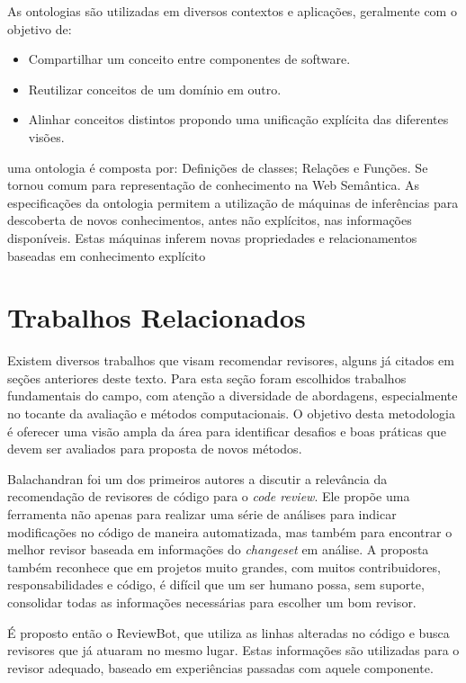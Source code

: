 \documentclass[a4paper,12pt]{monografia}
\theoremstyle{plain}
\theoremstyle{definition}
\theoremstyle{remark}
\begin{document}
As ontologias são utilizadas em diversos contextos e aplicações, geralmente com o objetivo de:

\begin{itemize}
  \item Compartilhar um conceito entre componentes de software.
  \item Reutilizar conceitos de um domínio em outro.
  \item Alinhar conceitos distintos propondo uma unificação explícita das diferentes visões.
\end{itemize}

uma ontologia é composta por: Definições de classes; Relações e Funções. Se tornou comum para representação de conhecimento na Web Semântica. As especificações da ontologia permitem a utilização de máquinas de inferências para descoberta de novos conhecimentos, antes não explícitos, nas informações disponíveis. Estas máquinas inferem novas propriedades e relacionamentos baseadas em conhecimento explícito \cite{berners2001}

\chapter{Trabalhos Relacionados}\label{cha:relacionados}

Existem diversos trabalhos que visam recomendar revisores, alguns já citados em seções anteriores deste texto. Para esta seção foram escolhidos trabalhos fundamentais do campo, com atenção a diversidade de abordagens, especialmente no tocante da avaliação e métodos computacionais. O objetivo desta metodologia é oferecer uma visão ampla da área para identificar desafios e boas práticas que devem ser avaliados para proposta de novos métodos.

Balachandran \cite{balachandran2013} foi um dos primeiros autores a discutir a relevância da recomendação de revisores de código para o \textit{code review}. Ele propõe uma ferramenta não apenas para realizar uma série de análises para indicar modificações no código de maneira automatizada, mas também para encontrar o melhor revisor baseada em informações do \textit{changeset} em análise. A proposta também reconhece que em projetos muito grandes,  com muitos contribuidores, responsabilidades e código, é difícil que um ser humano possa, sem suporte, consolidar todas as informações necessárias para escolher um bom revisor.

É proposto então o ReviewBot, que utiliza as linhas alteradas no código e busca revisores que já atuaram no mesmo lugar. Estas informações são utilizadas para o revisor adequado, baseado em experiências passadas com aquele componente.
\end{document}
